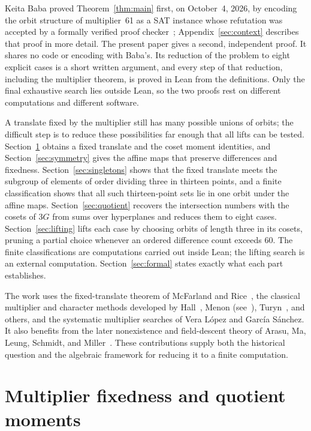 \documentclass[11pt]{article}
\begin{document}
Keita Baba proved Theorem~\ref{thm:main} first, on October~4, 2026, by
encoding the orbit structure of multiplier~61 as a SAT instance whose
refutation was accepted by a formally verified proof
checker~\cite[Steps~1--5 and~8(a)]{Baba2026}; Appendix~\ref{sec:context}
describes that proof in more detail. The present paper gives a second,
independent proof. It shares no code or encoding with Baba's. Its
reduction of the problem to eight explicit cases is a short written
argument, and every step of that reduction, including the multiplier
theorem, is proved in Lean from the definitions. Only the final
exhaustive search lies outside Lean, so the two proofs rest on different
computations and different software.

A translate fixed by the multiplier still has many possible unions of
orbits; the difficult step is to reduce these possibilities far enough
that all lifts can be tested. Section~\ref{sec:multiplier} obtains a
fixed translate and the coset moment identities, and
Section~\ref{sec:symmetry} gives the affine maps that preserve
differences and fixedness. Section~\ref{sec:singletons} shows that the
fixed translate meets the subgroup of elements of order dividing three in
thirteen points, and a finite classification shows that all such
thirteen-point sets lie in one orbit under the affine maps.
Section~\ref{sec:quotient} recovers the intersection numbers with the
cosets of $3G$ from sums over hyperplanes and reduces them to eight
cases. Section~\ref{sec:lifting} lifts each case by choosing orbits of
length three in its cosets, pruning a partial choice whenever an ordered
difference count exceeds 60. The finite classifications are computations
carried out inside Lean; the lifting search is an external computation.
Section~\ref{sec:formal} states exactly what each part establishes.

The work uses the fixed-translate theorem of McFarland and
Rice~\cite{McFarlandRice1978}, the classical multiplier and character
methods developed by Hall~\cite{Hall1956}, Menon
(see~\cite[Theorem~5]{Miller2025}), Turyn~\cite{Turyn1965}, and others,
and the systematic multiplier searches of Vera L\'opez and Garc\'ia
S\'anchez. It also benefits from the later nonexistence and
field-descent theory of Arasu, Ma, Leung, Schmidt, and
Miller~\cite{ArasuMa2001,LeungMaSchmidt2004,LeungSchmidt2005,Miller2025}.
These contributions supply both the historical question and the
algebraic framework for reducing it to a finite computation.

\section{Multiplier fixedness and quotient moments}\label{sec:multiplier}
\end{document}
